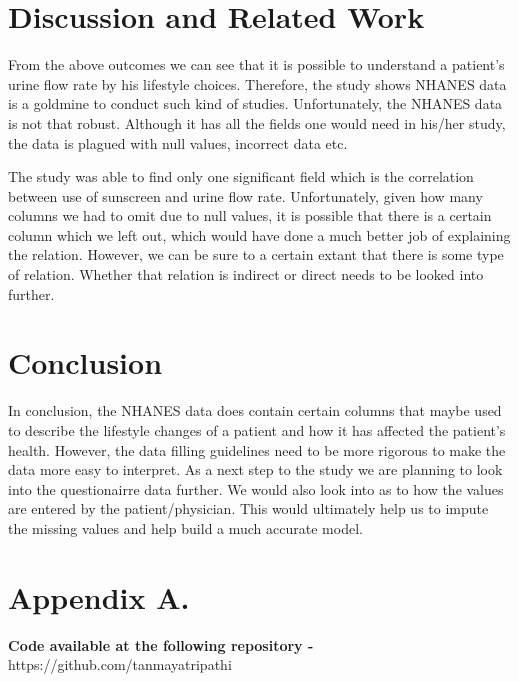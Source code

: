 \documentclass[twoside,11pt]{article}
\begin{document}
\section{Discussion and Related Work} 

From the above outcomes we can see that it is possible to understand a patient's urine flow rate by his lifestyle choices. Therefore, the study shows NHANES data is a goldmine to conduct such kind of studies. Unfortunately, the NHANES data is not that robust. Although it has all the fields one would need in his/her study, the data is plagued with null values, incorrect data etc.

\vspace{5mm} The study was able to find only one significant field which is the correlation between use of sunscreen and urine flow rate. Unfortunately, given how many columns we had to omit due to null values, it is possible that there is a certain column which we left out, which would have done a much better job of explaining the relation. However, we can be sure to a certain extant that there is some type of relation. Whether that relation is indirect or direct needs to be looked into further.

\section{Conclusion} 
In conclusion, the NHANES data does contain certain columns that maybe used to describe the lifestyle changes of a patient and how it has affected the patient's health. However, the data filling guidelines need to be more rigorous to make the data more easy to interpret. As a next step to the study we are planning to look into the questionairre data further. We would also look into as to how the values are entered by the patient/physician. This would ultimately help us to impute the missing values and help build a much accurate model.


\appendix
\section*{Appendix A.}
\textbf{Code available at the following repository - }https://github.com/tanmayatripathi
\end{document}
